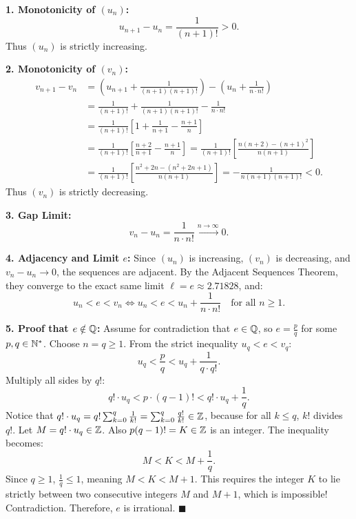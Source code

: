 \begin{solution}
\textbf{1. Monotonicity of $(u_n)$:}
\[
u_{n+1} - u_n = \frac{1}{(n+1)!} > 0.
\]
Thus $(u_n)$ is strictly increasing.

\textbf{2. Monotonicity of $(v_n)$:}
\begin{align*}
v_{n+1} - v_n &= \left( u_{n+1} + \frac{1}{(n+1)(n+1)!} \right) - \left( u_n + \frac{1}{n \cdot n!} \right) \\
&= \frac{1}{(n+1)!} + \frac{1}{(n+1)(n+1)!} - \frac{1}{n \cdot n!} \\
&= \frac{1}{(n+1)!} \left[ 1 + \frac{1}{n+1} - \frac{n+1}{n} \right] \\
&= \frac{1}{(n+1)!} \left[ \frac{n+2}{n+1} - \frac{n+1}{n} \right] = \frac{1}{(n+1)!} \left[ \frac{n(n+2) - (n+1)^2}{n(n+1)} \right] \\
&= \frac{1}{(n+1)!} \left[ \frac{n^2 + 2n - (n^2 + 2n + 1)}{n(n+1)} \right] = -\frac{1}{n(n+1)(n+1)!} < 0.
\end{align*}
Thus $(v_n)$ is strictly decreasing.

\textbf{3. Gap Limit:}
\[
v_n - u_n = \frac{1}{n \cdot n!} \xrightarrow{n \to \infty} 0.
\]

\textbf{4. Adjacency and Limit $e$:}
Since $(u_n)$ is increasing, $(v_n)$ is decreasing, and $v_n - u_n \to 0$, the sequences are adjacent.
By the Adjacent Sequences Theorem, they converge to the exact same limit $\ell = e \approx 2.71828$, and:
\[
u_n < e < v_n \iff u_n < e < u_n + \frac{1}{n \cdot n!} \quad \text{for all } n \ge 1.
\]

\textbf{5. Proof that $e \notin \mathbb{Q}$:}
Assume for contradiction that $e \in \mathbb{Q}$, so $e = \frac{p}{q}$ for some $p, q \in \mathbb{N}^*$.
Choose $n = q \ge 1$. From the strict inequality $u_q < e < v_q$:
\[
u_q < \frac{p}{q} < u_q + \frac{1}{q \cdot q!}.
\]
Multiply all sides by $q!$:
\[
q! \cdot u_q < p \cdot (q - 1)! < q! \cdot u_q + \frac{1}{q}.
\]
Notice that $q! \cdot u_q = q! \sum_{k=0}^q \frac{1}{k!} = \sum_{k=0}^q \frac{q!}{k!} \in \mathbb{Z}$, because for all $k \le q$, $k!$ divides $q!$.
Let $M = q! \cdot u_q \in \mathbb{Z}$. Also $p(q-1)! = K \in \mathbb{Z}$ is an integer.
The inequality becomes:
\[
M < K < M + \frac{1}{q}.
\]
Since $q \ge 1$, $\frac{1}{q} \le 1$, meaning $M < K < M + 1$.
This requires the integer $K$ to lie strictly between two consecutive integers $M$ and $M + 1$, which is impossible!
Contradiction. Therefore, $e$ is irrational. \hfill $\blacksquare$
\end{solution}

